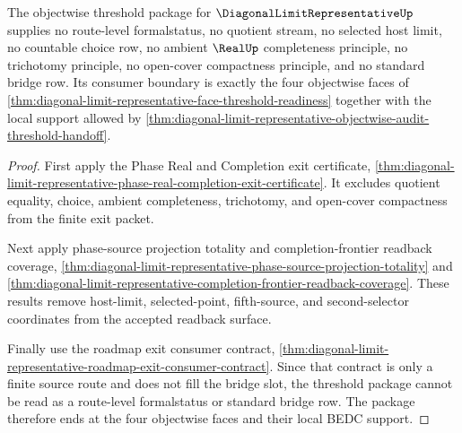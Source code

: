 \begin{theorem}
\label{thm:diagonal-limit-representative-exit-threshold-consumer-boundary}
The objectwise threshold package for $\DiagonalLimitRepresentativeUp$ supplies no route-level formalstatus, no quotient stream, no selected host limit, no countable choice row, no ambient $\RealUp$ completeness principle, no trichotomy principle, no open-cover compactness principle, and no standard bridge row. Its consumer boundary is exactly the four objectwise faces of \autoref{thm:diagonal-limit-representative-face-threshold-readiness} together with the local support allowed by \autoref{thm:diagonal-limit-representative-objectwise-audit-threshold-handoff}.
\end{theorem}
\begin{proof}
First apply the Phase Real and Completion exit certificate, \autoref{thm:diagonal-limit-representative-phase-real-completion-exit-certificate}. It excludes quotient equality, choice, ambient completeness, trichotomy, and open-cover compactness from the finite exit packet.

Next apply phase-source projection totality and completion-frontier readback coverage, \autoref{thm:diagonal-limit-representative-phase-source-projection-totality} and \autoref{thm:diagonal-limit-representative-completion-frontier-readback-coverage}. These results remove host-limit, selected-point, fifth-source, and second-selector coordinates from the accepted readback surface.

Finally use the roadmap exit consumer contract, \autoref{thm:diagonal-limit-representative-roadmap-exit-consumer-contract}. Since that contract is only a finite source route and does not fill the bridge slot, the threshold package cannot be read as a route-level formalstatus or standard bridge row. The package therefore ends at the four objectwise faces and their local BEDC support.
\end{proof}
